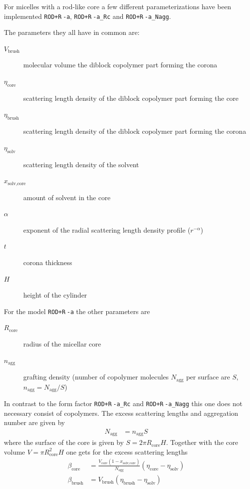 For micelles with a rod-like core a few different parameterizations have been
implemented \texttt{ROD+R$\hat{~}$-a}, \texttt{ROD+R$\hat{~}$-a\_Rc} and
\texttt{ROD+R$\hat{~}$-a\_Nagg}.

\vspace{3mm}

\noindent
The parameters they all have in common are:
\begin{description}
\item[$V_\text{brush}$] molecular volume the diblock copolymer part forming the corona
\item[$\eta_\text{core}$] scattering length density of the diblock copolymer part forming the core
\item[$\eta_\text{brush}$] scattering length density of the diblock copolymer part forming the corona
\item[$\eta_\text{solv}$] scattering length density of the solvent
\item[$x_\text{solv,core}$] amount of solvent in the core
\item[$\alpha$] exponent of the radial scattering length density profile ($r^{-\alpha}$)
\item[$t$] corona thickness
\item[$H$] height of the cylinder
\end{description}

\vspace{3mm}
\noindent
For the model \texttt{ROD+R$\hat{~}$-a} the other parameters are
\begin{description}
\item[$R_\text{core}$] radius of the micellar core
\item[$n_\text{agg}$] grafting density (number of copolymer molecules
$N_\text{agg}$ per surface are $S$, $n_\text{agg}=N_\text{agg}/S$)
\end{description}

\noindent
In contrast to the form factor \texttt{ROD+R$\hat{~}$-a\_Rc} and \texttt{ROD+R$\hat{~}$-a\_Nagg}
this one does not necessary consist of copolymers.
The excess scattering lengths and aggregation number are given by
\begin{align}
N_\text{agg} &= n_\text{agg} S
\end{align}
where the surface of the core is given by $S=2\pi R_\text{core}H$. Together with the
core volume  $V =\pi R_\text{core}^2H$ one gets for the excess scattering
lengths
\begin{align}
\beta_\text{core} &= \frac{V_\text{core} (1-x_\text{solv,core})}{N_\text{agg}}
(\eta_\text{core}-\eta_\text{solv}) \\
\beta_\text{brush} &= V_\text{brush} (\eta_\text{brush}-\eta_\text{solv})
\end{align}

